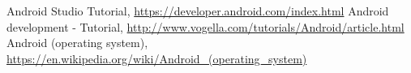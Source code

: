 \begin{thebibliography}{99999}
\singlespace\normalsize

 Android Studio Tutorial, \url{https://developer.android.com/index.html}
 Android development - Tutorial, \url{http://www.vogella.com/tutorials/Android/article.html}
 Android (operating system), \url{https://en.wikipedia.org/wiki/Android_(operating_system)}





\end{thebibliography}
